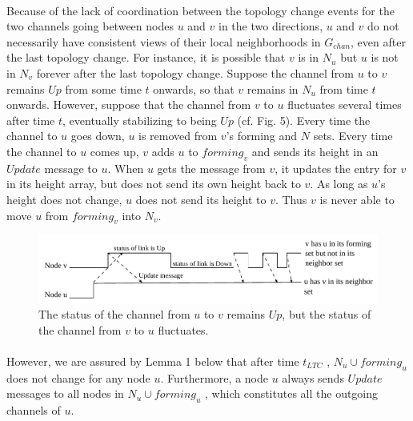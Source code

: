 \paragraph{}Because of the lack of coordination between the topology change events for the two channels going between nodes $u$ and $v$ in the two directions, $u$ and $v$ do not necessarily have consistent views of their local neighborhoods in $G_{chan}$, even after the last topology change. For instance, it is possible that $v$ is in $N_u$ but $u$ is not in $N_v$ forever after the last topology change. Suppose the channel from $u$ to $v$ remains $Up$ from some time $t$ onwards, so that $v$ remains in $N_u$ from time $t$ onwards. However, suppose that the channel from $v$ to $u$ fluctuates several times after time $t$, eventually stabilizing to being $Up$ (cf. Fig. 5). Every time the channel to $u$ goes down, $u$ is removed from $v$'s forming and $N$ sets. Every time the channel to $u$ comes up, $v$ adds $u$ to $forming_v$ and sends its height in an $Update$ message to $u$. When $u$ gets the message from $v$, it updates the entry for $v$ in its height array, but does not send its own height back to $v$. As long as $u$'s height does not change, $u$ does not send its height to $v$. Thus $v$ is never able to move $u$ from $forming_v$ into $N_v$.
\begin{figure}[h]
	\centering
	\includegraphics[width=1\linewidth]{fig_1}
	\caption[The status of the channel from $u$ to $v$ remains $Up$, but the status of the channel from $v$ to $u$ fluctuates.]{The status of the channel from $u$ to $v$ remains $Up$, but the status of the channel from $v$ to $u$ fluctuates.}
	\label{fig:fig1}
\end{figure}
\paragraph{}However, we are assured by Lemma 1 below that after time $t_{LTC}$ , $N_u \cup forming_u$ does not change for any node $u$. Furthermore, a node $u$ always sends $Update$ messages to all nodes in $N_u \cup forming_u$ , which constitutes all the outgoing channels of $u$.
